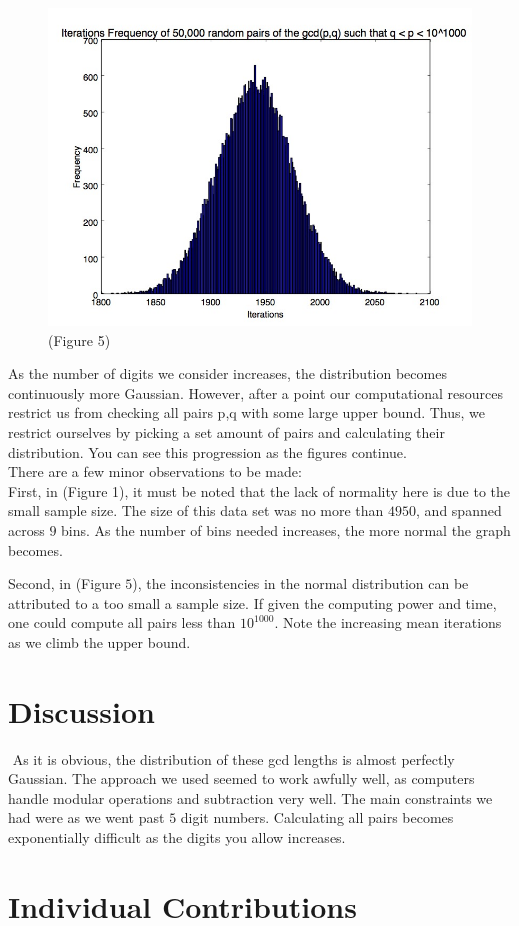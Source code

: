 \documentclass[11pt]{article}
\begin{document}
	\begin{figure}
		\centering

		\includegraphics[scale=.4]{1000_digit_numbers.jpg}
		\center \tiny(Figure 5)
		
	\end{figure}
	\newpage
	As the number of digits we consider increases, the distribution	 becomes continuously more Gaussian. However, after a point our computational resources restrict us from checking all pairs p,q with some large upper bound. Thus, we restrict ourselves by picking a set amount of pairs and calculating their distribution. You can see this progression as the figures continue.\\
	
	There are a few minor observations to be made:\\
	
	 First, in (Figure 1), it must be noted that the lack of normality here is due to the small sample size. The size of this data set was no more than $4950$, and spanned across $9$ bins. As the number of bins needed increases, the more normal the graph becomes. 
	
	 Second, in (Figure $5$), the inconsistencies in the normal distribution can be attributed to a too small a sample size. If given the computing power and time, one could compute all pairs less than $10^{1000}$. Note the increasing mean iterations as we climb the upper bound.
\section{Discussion}$ $
\indent As it is obvious, the distribution of these gcd lengths is almost perfectly Gaussian. The approach we used seemed to work awfully well, as computers handle modular operations and subtraction very well. The main constraints we had were as we went past $5$ digit numbers. Calculating all pairs becomes exponentially difficult as the digits you allow increases. 



\section{Individual Contributions}$ $
\end{document}
